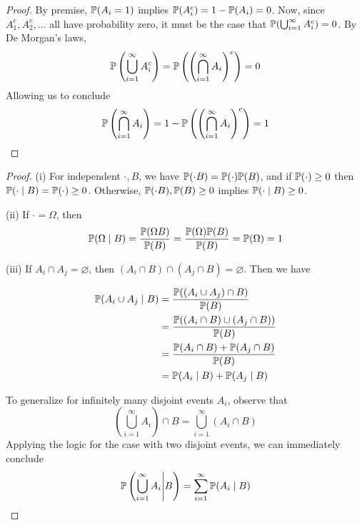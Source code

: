 \documentclass[a4paper]{article}
\begin{document}
\begin{proof}[Proof] 
	By premise, \(\mathbb{P}(A_{i} = 1)\) implies \(\mathbb{P}(A_{i}^{c}) = 1 - \mathbb{P}(A_{i}) = 0\). Now, since \(A_{1}^{c}, A_{2}^{c},\dots\) all have probability zero, it must be the case that \(\mathbb{P}(\bigcup_{i=1}^{\infty}A_{i}^{c} ) = 0\). By De Morgan's laws,
\[
	\mathbb{P}\left(\bigcup_{i=1}^{\infty} A_{i}^{c} \right) = \mathbb{P}\left( \left(\bigcap_{i=1}^{\infty} A_{i} \right)^{c} \right) = 0 
\]
Allowing us to conclude
\[
	\mathbb{P}\left( \bigcap_{i=1}^{\infty} A_{i} \right) = 1 - \mathbb{P}\left( \left(\bigcap_{i=1}^{\infty} A_{i} \right)^{c} \right) = 1 
\]
\end{proof}


\begin{proof}[Proof] 
(i) For independent \(\cdot, B\), we have \(\mathbb{P}(\cdot B) = \mathbb{P}(\cdot) \mathbb{P}(B)\), and if \(\mathbb{P}(\cdot) \ge 0\) then \(\mathbb{P}(\cdot \mid B) = \mathbb{P}(\cdot) \ge 0\). Otherwise, \(\mathbb{P}(\cdot B), \mathbb{P}(B) \ge 0\) implies \(\mathbb{P}(\cdot \mid B) \ge 0\).
\vspace{12pt}
\par (ii) If \(\cdot = \Omega\), then
\[
	\mathbb{P}(\Omega \mid B) = \frac{\mathbb{P}(\Omega B)}{\mathbb{P}(B)} = \frac{\mathbb{P}(\Omega) \mathbb{P}(B)}{\mathbb{P}(B)} = \mathbb{P}(\Omega) = 1
\]
\vspace{12pt}
\par (iii) If \(A_{i} \cap A_{j} = \varnothing\), then \( (A_{i} \cap B) \cap (A_{j} \cap B) = \varnothing\). Then we have

\begin{align*}
	\mathbb{P}(A_{i} \cup A_{j} \mid B) & = \frac{\mathbb{P}((A_{i} \cup A_{j}) \cap B)}{\mathbb{P}(B)} \\
			       & = \frac{\mathbb{P}((A_{i} \cap B) \cup (A_{j} \cap B))}{\mathbb{P}(B)}  \\
			       & = \frac{\mathbb{P}(A_{i} \cap B) + \mathbb{P}(A_{j} \cap B)}{\mathbb{P}(B)} \\
			       & = \mathbb{P}(A_{i} \mid B) + \mathbb{P}(A_{j} \mid B)
\end{align*}

To generalize for infinitely many disjoint events \(A_{i}\), observe that 
\[
	\left( \bigcup_{i = 1}^{\infty} A_{i} \right) \cap B = \bigcup_{i = 1}^{\infty} (A_{i} \cap B)
\]
Applying the logic for the case with two disjoint events, we can immediately conclude
\[
	\mathbb{P}\left( \bigcup_{i = 1}^{\infty} A_{i} \Bigg| B \right) = \sum_{i=1}^{\infty} \mathbb{P}(A_{i} \mid B)
\]
\end{proof}
\end{document}
